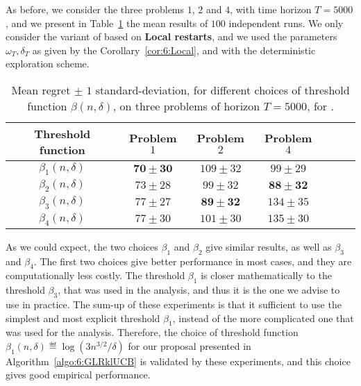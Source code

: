 As before, we consider the three problems $1$, $2$ and $4$, with time horizon $T=5000$,
and we present in Table~\ref{table:6:exploringDifferentThresholdFunctions} the mean results of $100$ independent runs.
We only consider the variant of \GLRklUCB{} based on \textbf{Local restarts}, and we used the parameters $\omega_T,\delta_T$ as given by the Corollary~\ref{cor:6:Local},
and with the deterministic exploration scheme.

\begin{table}[ht]
    \centering
    \begin{tabular}{c|cccccc}
        \textbf{Threshold function} & Problem $1$ & Problem $2$ & Problem $4$ \\
        \hline
        $\beta_1(n,\delta)$ & $\mathbf{70 \pm 30}$ & $109 \pm 32$ & $99 \pm 29$ \\
        $\beta_2(n,\delta)$ & $73 \pm 28$ & $99 \pm 32$ & $\mathbf{88 \pm 32}$ \\
        $\beta_3(n,\delta)$ & $77 \pm 27$ & $\mathbf{89 \pm 32}$ & $134 \pm 35$ \\
        $\beta_4(n,\delta)$ & $77 \pm 30$ & $101 \pm 30$ & $135 \pm 30$
    \end{tabular}
    \caption{Mean regret $\pm$ $1$ standard-deviation, for different choices of threshold function $\beta(n,\delta)$, on three problems of horizon $T=5000$, for \GLRklUCB.}
    \label{table:6:exploringDifferentThresholdFunctions}
\end{table}

As we could expect, the two choices $\beta_1$ and $\beta_2$ give similar results, as well as $\beta_3$ and $\beta_4$. The first two choices give better performance in most cases, and they are computationally less costly.
The threshold $\beta_1$ is closer mathematically to the threshold $\beta_3$, that was used in the analysis, and thus it is the one we advise to use in practice.
The sum-up of these experiments is that it sufficient to use the simplest and most explicit threshold $\beta_1$, instead of the more complicated one that was used for the analysis.
Therefore, the choice of threshold function $\beta_1(n, \delta) \eqdef \log\left(3 n^{3/2} / \delta\right)$ for our proposal \GLRklUCB{} presented in Algorithm~\ref{algo:6:GLRklUCB} is validated by these experiments, and this choice gives good empirical performance.


